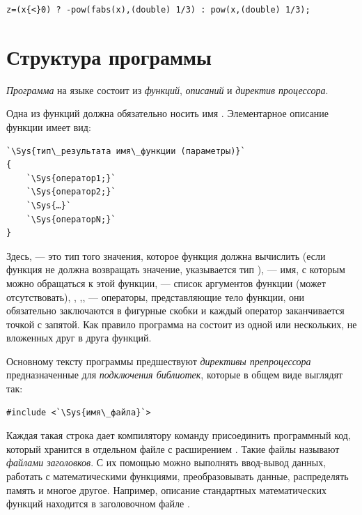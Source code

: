 \noindent\lstinline!z=(x{<}0) ? -pow(fabs(x),(double) 1/3) : pow(x,(double) 1/3);!

\section[Структура программы]{Структура программы}\label{ch02:8}
\emph{Программа} на языке  состоит из
\emph{функций}, \emph{описаний} и \emph{директив процессора}. 

Одна из функций должна обязательно носить имя . Элементарное описание функции имеет вид:

\begin{lstlisting}
`\Sys{тип\_результата имя\_функции (параметры)}`
{
    `\Sys{оператор1;}`
    `\Sys{оператор2;}`
    `\Sys{…}`
    `\Sys{операторN;}`
}
\end{lstlisting}

Здесь,  --- это тип того значения, которое функция должна вычислить (если функция не
должна возвращать значение, указывается тип ),  --- имя, с которым
можно обращаться к этой функции,  --- список аргументов функции (может отсутствовать),
, ,,  --- операторы, представляющие
тело функции, они обязательно заключаются в фигурные скобки и каждый оператор заканчивается точкой с запятой. Как
правило программа на  состоит из одной или нескольких, не вложенных друг в друга функций.

Основному тексту программы предшествуют \emph{директивы препроцессора}
предназначенные для \emph{подключения библиотек}, которые в общем виде
выглядят так:
\begin{lstlisting}
#include <`\Sys{имя\_файла}`>
\end{lstlisting}

Каждая такая строка дает компилятору команду присоединить программный код, который хранится в отдельном файле с
расширением . Такие файлы называют \emph{файлами заголовков}. С их помощью можно
выполнять ввод-вывод данных, работать с математическими функциями, преобразовывать данные, распределять память и многое
другое. Например, описание стандартных математических функций находится в заголовочном файле .

